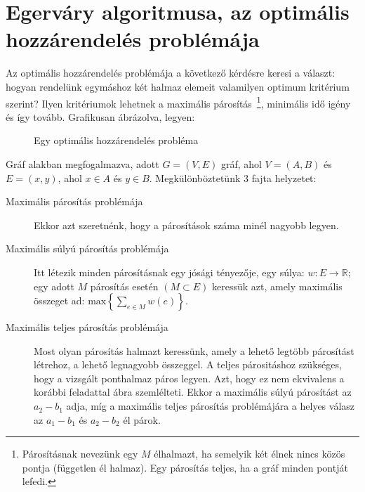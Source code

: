 \section{Egerváry algoritmusa, az optimális hozzárendelés problémája}

Az optimális hozzárendelés problémája a következő kérdésre keresi a választ:
hogyan rendelünk egymáshoz két halmaz elemeit valamilyen optimum kritérium
szerint? Ilyen kritériumok lehetnek a maximális párosítás~\footnote{ Párosításnak
nevezünk egy $M$ élhalmazt, ha semelyik két élnek nincs közös pontja (független
él halmaz). Egy párosítás teljes, ha a gráf minden pontját lefedi.}, minimális
idő igény és így tovább. Grafikusan ábrázolva, legyen:

\begin{figure}[ht]
\caption{Egy optimális hozzárendelés probléma}
\label{fig:OptHozProb}
\centering {} 
\end{figure}

Gráf alakban megfogalmazva, adott $G=(V, E)$ gráf, ahol $V=(A, B)$ és $E=(x,y)$,
ahol $x \in A$ és $ y \in B$. Megkülönböztetünk $3$ fajta helyzetet:
\begin{description}
  \item[Maximális párosítás problémája] Ekkor azt szeretnénk, hogy a párosítások
  száma minél nagyobb legyen.
  \item[Maximális súlyú párosítás problémája] Itt létezik minden párosításnak
  egy jósági tényezője, egy súlya: $w:E\rightarrow\mathbb{R}$; egy adott $M$
  párosítás esetén $(M\subset E)$ keressük azt, amely maximális összeget ad:
  $\mbox{max}\left\{\sum_{e\in M}{w(e)}\right\}$.
  \item[Maximális teljes párosítás problémája] Most olyan párosítás halmazt
  keressünk, amely a lehető legtöbb párosítást létrehoz, a lehető legnagyobb
  összeggel. A teljes párositáshoz szükséges, hogy a vizsgált ponthalmaz páros
  legyen. Azt, hogy ez nem ekvivalens a korábbi feladattal
   ábra szemlélteti. Ekkor a maximális súlyú párosítást
  az $a_2-b_1$ adja, míg a maximális teljes párosítás problémájára a helyes
  válasz az $a_1-b_1$ és $a_2-b_2$ él párok.
\end{description}

